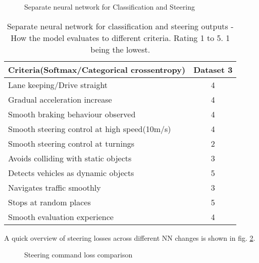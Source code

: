 \begin{figure}[!ht]
	\centering
    \def\svgwidth{\textwidth}
    \caption{Separate neural network for Classification and Steering}
    \label{fig:ds3categoricalcrossentropy2nn}
\end{figure}
\begin{table}[!ht]
    \centering
\begin{tabular}{lc}
    \toprule
    Criteria(Softmax/Categorical crossentropy) & Dataset 3 \\\midrule
    Lane keeping/Drive straight  & 4  \\
    Gradual acceleration increase  & 4\\
    Smooth braking behaviour observed & 4 \\
    Smooth steering control at high speed(10m/s) & 4 \\
    Smooth steering control at turnings & 2\\
    Avoids colliding with static objects & 3 \\
    Detects vehicles as dynamic objects & 5 \\
    Navigates traffic smoothly & 3\\
    Stops at random places & 5 \\
    Smooth evaluation experience & 4 \\\bottomrule
\end{tabular}
\caption{Separate neural network for classification and steering outputs - How the model
evaluates to different criteria. Rating 1 to 5. 1 being the lowest.}
\label{table:cce2NN}
\end{table}

A quick overview of steering losses across different NN changes is shown in fig. \ref{fig:ds3categoricalcrossentropysteeringcompare}.
 \begin{figure}[!ht]
	\centering
    \def\svgwidth{0.9\textwidth}
    \caption{Steering command loss comparison}
    \label{fig:ds3categoricalcrossentropysteeringcompare}
\end{figure}

